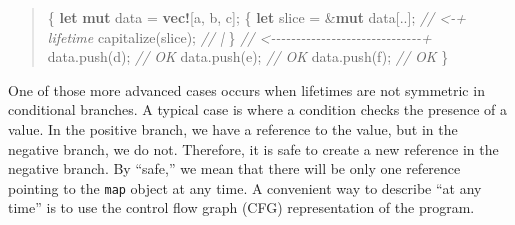 \documentclass[
  11pt,
  twoside,symmetric]{report}
\newenvironment{Shaded}{}{}
\newcommand{\CharTok}[1]{#1}
\newcommand{\CommentTok}[1]{\textit{#1}}
\newcommand{\KeywordTok}[1]{\textbf{#1}}
\newcommand{\NormalTok}[1]{#1}
\newcommand{\OperatorTok}[1]{#1}
\newcommand{\PreprocessorTok}[1]{\textbf{#1}}
\begin{document}
\begin{quote}
\begin{Shaded}
\begin{Highlighting}[]
\OperatorTok{\{}
    \KeywordTok{let} \KeywordTok{mut}\NormalTok{ data }\OperatorTok{=} \PreprocessorTok{vec!}\NormalTok{[}\CharTok{\textquotesingle{}a\textquotesingle{}}\OperatorTok{,} \CharTok{\textquotesingle{}b\textquotesingle{}}\OperatorTok{,} \CharTok{\textquotesingle{}c\textquotesingle{}}\NormalTok{]}\OperatorTok{;}
    \OperatorTok{\{}
        \KeywordTok{let}\NormalTok{ slice }\OperatorTok{=} \OperatorTok{\&}\KeywordTok{mut}\NormalTok{ data[}\OperatorTok{..}\NormalTok{]}\OperatorTok{;} \CommentTok{// \textless{}{-}+ \textquotesingle{}lifetime}
\NormalTok{        capitalize(slice)}\OperatorTok{;}         \CommentTok{//   |}
    \OperatorTok{\}} \CommentTok{// \textless{}{-}{-}{-}{-}{-}{-}{-}{-}{-}{-}{-}{-}{-}{-}{-}{-}{-}{-}{-}{-}{-}{-}{-}{-}{-}{-}{-}{-}{-}{-}+}
\NormalTok{    data}\OperatorTok{.}\NormalTok{push(}\CharTok{\textquotesingle{}d\textquotesingle{}}\NormalTok{)}\OperatorTok{;} \CommentTok{// OK}
\NormalTok{    data}\OperatorTok{.}\NormalTok{push(}\CharTok{\textquotesingle{}e\textquotesingle{}}\NormalTok{)}\OperatorTok{;} \CommentTok{// OK}
\NormalTok{    data}\OperatorTok{.}\NormalTok{push(}\CharTok{\textquotesingle{}f\textquotesingle{}}\NormalTok{)}\OperatorTok{;} \CommentTok{// OK}
\OperatorTok{\}}
\end{Highlighting}
\end{Shaded}
\end{quote}

One of those more advanced cases occurs when lifetimes are not symmetric
in conditional branches. A typical case is where a condition checks the
presence of a value. In the positive branch, we have a reference to the
value, but in the negative branch, we do not. Therefore, it is safe to
create a new reference in the negative branch. By ``safe,'' we mean that
there will be only one reference pointing to the \texttt{map} object at
any time. A convenient way to describe ``at any time'' is to use the
control flow graph (CFG) representation of the program.
\end{document}
